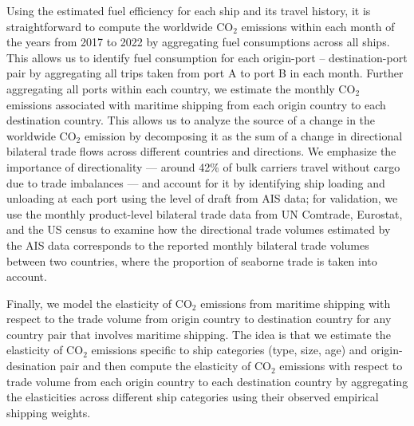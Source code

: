 \documentclass[hidelinks, 12pt,letterpaper]{article}
\begin{document}
Using the estimated fuel efficiency for each ship and its travel history, it is straightforward to compute the worldwide CO$_2$ emissions within each month of the years from 2017 to 2022 by aggregating fuel consumptions across all ships. This allows us to identify fuel consumption for each origin-port -- destination-port pair
by aggregating all trips taken from port A to port B in each month. Further aggregating all ports within each country, we estimate the monthly CO$_2$ emissions associated with maritime shipping from each origin country to each destination country.
This allows us to analyze the source of a change in the worldwide CO$_2$ emission by decomposing it as the sum of a change in directional bilateral trade flows across different countries and directions. We emphasize the importance of directionality --- around 42\% of bulk carriers travel without cargo due to trade imbalances \citep{brancaccio2020geography} --- and account for it by identifying ship loading and unloading at each port using the level of draft from AIS data; for validation, we use the monthly  product-level  bilateral trade data  from UN Comtrade,
Eurostat, and the US census to examine how the directional trade volumes estimated by the AIS data corresponds to the reported  monthly bilateral trade volumes between two countries, where the proportion of seaborne trade is taken into account. 


Finally, we model the elasticity of CO$_2$ emissions from maritime shipping with respect to the trade volume from origin country to destination country for any country pair that involves maritime shipping. The idea is that we estimate  the elasticity of CO$_2$ emissions specific to ship categories (type, size, age) and origin-desination pair and then compute the elasticity of CO$_2$ emissions with respect to trade volume from each origin country to each destination country by aggregating the elasticities across different ship categories using their  observed empirical shipping weights.
\end{document}
